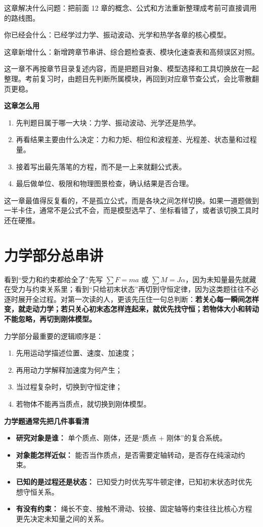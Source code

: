 \documentclass[lang=cn,11pt]{elegantbook}
\newcommand{\bridge}[1]{\begin{note}#1\end{note}}
\newcommand{\chapterroadmap}[3]{%
\begin{introduction}
 \item {\heiti 这章解决什么问题：}#1
 \item {\heiti 你已经会什么：}#2
 \item {\heiti 这章新增什么：}#3
\end{introduction}}
\begin{document}
\chapterroadmap
{把前面 12 章的概念、公式和方法重新整理成考前可直接调用的路线图。}
{已经学过力学、振动波动、光学和热学各章的核心模型。}
{新增跨章节串讲、综合题检查表、模块化速查表和高频误区对照。}

\bridge{这一章不再按章节目录复述内容，而是把题目对象、模型选择和工具切换放在一起整理。考前复习时，由题目先判断所属模块，再回到对应章节查公式，会比零散翻页更稳。}

\textbf{这章怎么用}

\begin{enumerate}
 \item 先判题目属于哪一大块：力学、振动波动、光学还是热学。
 \item 再看结果主要由什么决定：力和力矩、相位和波程差、光程差、状态量和过程量。
 \item 接着写出最先落笔的方程，而不是一上来就翻公式表。
 \item 最后做单位、极限和物理图景检查，确认结果是否合理。
\end{enumerate}

\begin{remark}
这一章最值得反复看的，不是孤立公式，而是各块之间怎样切换。如果一道题做到一半卡住，通常不是公式不会，而是模型选早了、坐标看错了，或者该切换工具时还在硬推。
\end{remark}

\section{力学部分总串讲}

\bridge{看到“受力和约束都给全了”先写 \(\sum F=ma\) 或 \(\sum M=J\alpha\)，因为未知量最先就藏在受力与约束关系里；看到“只给初末状态”再切到守恒定律，因为这类题往往不必逐时展开全过程。对第一次读的人，更该先压住一句总判断：\textbf{若关心每一瞬间怎样变，就走动力学；若只关心初末态怎样连起来，就优先找守恒；若物体大小和转动不能忽略，再切到刚体模型。}}

力学部分最重要的逻辑顺序是：
\begin{enumerate}
 \item 先用运动学描述位置、速度、加速度；
 \item 再用动力学解释加速度为何产生；
 \item 当过程复杂时，切换到守恒定律；
 \item 若物体不能再当质点，就切换到刚体模型。
\end{enumerate}

\textbf{力学题通常先把几件事看清}

\begin{itemize}
 \item \textbf{研究对象是谁：} 单个质点、刚体，还是“质点 + 刚体”的复合系统。
 \item \textbf{对象能怎样近似：} 能否当作质点，是否需要定轴转动，是否存在纯滚动约束。
 \item \textbf{已知的是过程还是状态：} 已知受力时优先写牛顿定律，已知初末状态时优先想守恒关系。
 \item \textbf{有没有约束：} 绳长不变、接触不滑动、铰接、固定轴等约束往往比核心方程更先决定未知量之间的关系。
\end{itemize}
\end{document}

